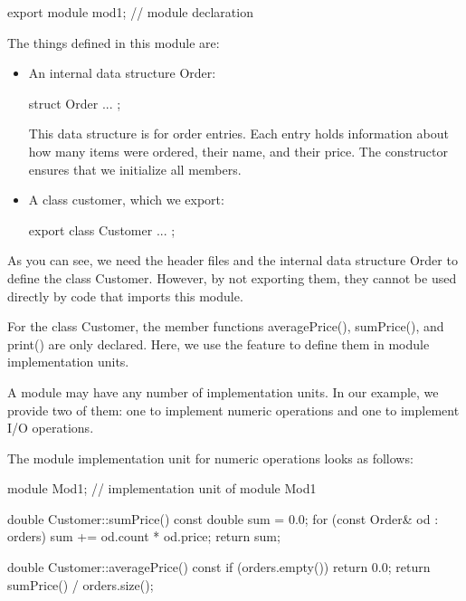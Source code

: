 \begin{cpp}
export module mod1; // module declaration
\end{cpp}

The things defined in this module are:

\begin{itemize}
\item 
An internal data structure Order:

\begin{cpp}
struct Order {
	...
};
\end{cpp}

This data structure is for order entries. Each entry holds information about how many items were ordered, their name, and their price. The constructor ensures that we initialize all members.

\item 
A class customer, which we export:

\begin{cpp}
export class Customer {
	...
};
\end{cpp}
\end{itemize}

As you can see, we need the header files and the internal data structure Order to define the class Customer. However, by not exporting them, they cannot be used directly by code that imports this module.

For the class Customer, the member functions averagePrice(), sumPrice(), and print() are only declared. Here, we use the feature to define them in module implementation units.


A module may have any number of implementation units. In our example, we provide two of them: one to implement numeric operations and one to implement I/O operations.

The module implementation unit for numeric operations looks as follows:


\begin{cpp}
module Mod1; // implementation unit of module Mod1

double Customer::sumPrice() const
{
	double sum = 0.0;
	for (const Order& od : orders) {
		sum += od.count * od.price;
	}
	return sum;
}

double Customer::averagePrice() const
{
	if (orders.empty()) {
		return 0.0;
	}
	return sumPrice() / orders.size();
}
\end{cpp}


